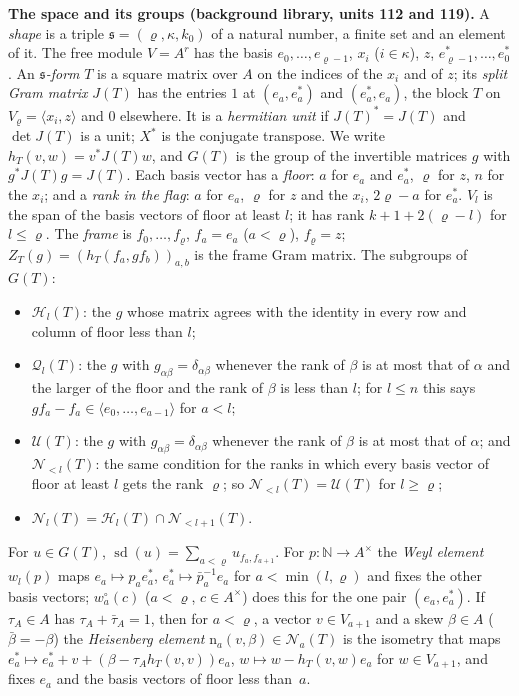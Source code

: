 \documentclass[11pt,a4paper]{article}
\newcommand{\subhead}[1]{\par\addvspace{9pt plus 2pt}\Needspace{4\baselineskip}\noindent\textbf{#1}\enspace\ignorespaces}
\theoremstyle{plainx}
\theoremstyle{uprightx}
\newcommand{\NN}{\mathbb{N}}
\newcommand{\GT}[1]{G(#1)}
\newcommand{\JT}[1]{J(#1)}
\newcommand{\Hl}[2]{\mathcal{H}_{#1}(#2)}
\newcommand{\Ql}[2]{\mathcal{Q}_{#1}(#2)}
\newcommand{\Nb}[2]{\mathcal{N}_{<#1}(#2)}
\newcommand{\Nf}[2]{\mathcal{N}_{#1}(#2)}
\newcommand{\UT}[1]{\mathcal{U}(#1)}
\newcommand{\ZT}[2]{Z_{#1}(#2)}
\newcommand{\sd}{\operatorname{sd}}
\newcommand{\wl}[2]{w_{#1}(#2)}
\newcommand{\wo}[2]{w^{\circ}_{#1}(#2)}
\begin{document}
\subhead{The space and its groups (background library, units 112 and 119).}\label{s:space} A
\emph{shape} is a triple $\mathfrak{s}=(\varrho,\kappa,k_0)$ of a natural number, a finite set and an element of it.
The free module $V=A^{r}$ has the basis $e_0,\dots,e_{\varrho-1}$, $x_i$ ($i\in\kappa$), $z$,
$e^*_{\varrho-1},\dots,e^*_0$. An \emph{$\mathfrak{s}$-form} $T$ is a square matrix over $A$ on the indices of the
$x_i$ and of $z$; its \emph{split Gram matrix} $\JT{T}$ has the entries $1$ at $(e_a,e^*_a)$ and $(e^*_a,e_a)$, the
block $T$ on $V_\varrho=\langle x_i,z\rangle$ and $0$ elsewhere. It is a \emph{hermitian unit} if
$\JT{T}^{*}=\JT{T}$ and $\det\JT{T}$ is a unit; $X^{*}$ is the conjugate transpose. We write $h_T(v,w)=v^{*}\JT{T}w$,
and $\GT{T}$ is the group of the invertible matrices $g$ with $g^{*}\JT{T}g=\JT{T}$. Each basis vector has a
\emph{floor}: $a$ for $e_a$ and $e^*_a$, $\varrho$ for $z$, $n$ for the $x_i$; and a \emph{rank in the flag}: $a$ for
$e_a$, $\varrho$ for $z$ and the $x_i$, $2\varrho-a$ for $e^*_a$. $V_l$ is the span of the basis vectors of floor at
least $l$; it has rank $k+1+2(\varrho-l)$ for $l\le\varrho$. The \emph{frame} is $f_0,\dots,f_\varrho$, $f_a=e_a$
($a<\varrho$), $f_\varrho=z$; $\ZT{T}{g}=(h_T(f_a,gf_b))_{a,b}$ is the frame Gram matrix. The subgroups of $\GT{T}$:
\begin{itemize}
\item $\Hl{l}{T}$: the $g$ whose matrix agrees with the identity in every row and column of floor less than $l$;
\item $\Ql{l}{T}$: the $g$ with $g_{\alpha\beta}=\delta_{\alpha\beta}$ whenever the rank of $\beta$ is at most that of
  $\alpha$ and the larger of the floor and the rank of $\beta$ is less than $l$; for $l\le n$ this says
  $gf_a-f_a\in\langle e_0,\dots,e_{a-1}\rangle$ for $a<l$;
\item $\UT{T}$: the $g$ with $g_{\alpha\beta}=\delta_{\alpha\beta}$ whenever the rank of $\beta$ is at most that of
  $\alpha$; and $\Nb{l}{T}$: the same condition for the ranks in which every basis vector of floor at least $l$ gets
  the rank $\varrho$; so $\Nb{l}{T}=\UT{T}$ for $l\ge\varrho$;
\item $\Nf{l}{T}=\Hl{l}{T}\cap\Nb{l+1}{T}$.
\end{itemize}
For $u\in\GT{T}$, $\sd(u)=\sum_{a<\varrho}u_{f_a,f_{a+1}}$. For $p\colon\NN\to A^{\times}$ the \emph{Weyl element}
$\wl{l}{p}$ maps $e_a\mapsto p_ae^*_a$, $e^*_a\mapsto\bar p_a^{-1}e_a$ for $a<\min(l,\varrho)$ and fixes the other
basis vectors; $\wo{a}{c}$ ($a<\varrho$, $c\in A^{\times}$) does this for the one pair $(e_a,e^*_a)$. If
$\tau_A\in A$ has $\tau_A+\bar\tau_A=1$, then for $a<\varrho$, a vector $v\in V_{a+1}$ and a skew $\beta\in A$
($\bar\beta=-\beta$) the \emph{Heisenberg element} $\mathrm{n}_a(v,\beta)\in\Nf{a}{T}$ is the isometry that maps
$e^*_a\mapsto e^*_a+v+(\beta-\tau_Ah_T(v,v))e_a$, $w\mapsto w-h_T(v,w)e_a$ for $w\in V_{a+1}$, and fixes $e_a$ and the
basis vectors of floor less than~$a$.
\end{document}
